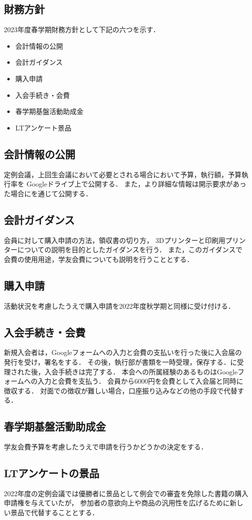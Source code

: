 \subsection*{財務方針}


2023年度春学期財務方針として下記の六つを示す．
\begin{itemize}
    \item 会計情報の公開
    \item 会計ガイダンス
    \item 購入申請
    \item 入会手続き・会費
    \item 春学期基盤活動助成金
    \item LTアンケート景品
\end{itemize}

\subsection*{会計情報の公開}
定例会議，上回生会議において必要とされる場合において予算，執行額，予算執行率を Googleドライブ上で公開する．
また，より詳細な情報は開示要求があった場合に\kaikeiStaff{}を通じて公開する．

\subsection*{会計ガイダンス}
会員に対して購入申請の方法，領収書の切り方， 3Dプリンターと印刷用プリンターについての説明を目的としたガイダンスを行う．
また，このガイダンスで会費の使用用途，学友会費についても説明を行うこととする．

\subsection*{購入申請}
活動状況を考慮したうえで購入申請を2022年度秋学期と同様に受け付ける．

\subsection*{入会手続き・会費}
新規入会者は，Googleフォームへの入力と会費の支払いを行った後に入会届の発行を受け，署名をする．
その後，執行部が書類を一時受理，保存する．\president{}に受理された後，入会手続きは完了する．
本会への所属経験のあるものはGoogleフォームへの入力と会費を支払う．
会員から6000円を会費として入会届と同時に徴収する．
対面での徴収が難しい場合，口座振り込みなどの他の手段で代替する．

\subsection*{春学期基盤活動助成金}
学友会費予算を考慮したうえで申請を行うかどうかの決定をする．

\subsection*{LTアンケートの景品}
2022年度の定例会議では優勝者に景品として例会での審査を免除した書籍の購入申請権を与えていたが，
参加者の意欲向上や商品の汎用性を広げるために新しい景品で代替することとする．
